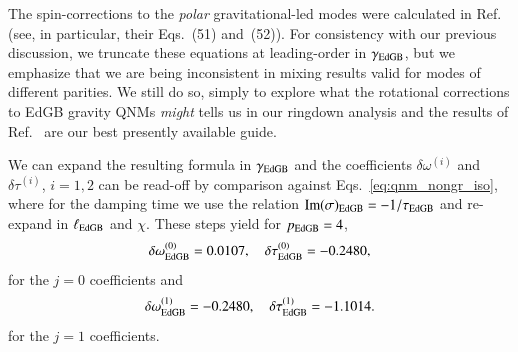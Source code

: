 \documentclass[twocolumn,
               prd,
               aps,
               superscriptaddress,
               tightenlines,
               nofootinbib,
               eqsecnum,
               amsfonts,
               amsmath,
               longbibliography]{revtex4-1}
\newcommand{\hscomm}[1]{{\textcolor{TealBlue}{{[HS: #1]}}}}
\newcommand{\abcomm}[1]{{\textcolor{red}{{[AB: #1]}}}}
\begin{document}
%
The spin-corrections to the \emph{polar} gravitational-led modes
were calculated in Ref.~\cite{Pierini:2021jxd} (see, in particular, their Eqs.~(51)
and~(52)).
%
For consistency with our previous discussion, we truncate these equations at
leading-order in $\gamma_{\rm EdGB}$, but we emphasize that we are being inconsistent in
mixing results valid for modes of different parities.
%
We still do so, simply to explore what the rotational corrections to EdGB gravity QNMs \emph{might}
tells us in our ringdown analysis and the results of Ref.~\cite{Pierini:2021jxd} are our best 
presently available guide.  

%
We can expand the resulting formula in $\gamma_{\rm EdGB}$ and the coefficients $\delta \omega^{(i)}$ and $\delta \tau^{(i)}$, $i=1,2$ can be
read-off by comparison against Eqs.~\eqref{eq:qnm_nongr_iso}, where for the damping time we use the relation ${\rm Im}(\sigma)_{\rm EdGB} = - 1 / \tau_{\rm EdGB}$
and re-expand in $\ell_{\rm EdGB}$ and $\chi$.
%
These steps yield for $p_{\rm EdGB} = 4$,
%
\begin{align}
     \delta \omega_{\rm EdGB}^{(0)} = 0.0107, \quad \delta \tau_{\rm EdGB}^{(0)} = -0.2480,
\end{align}
%
for the $j=0$ coefficients and
%
\begin{equation}
    \delta \omega_{\rm EdGB}^{(1)} = -0.2480, \quad \delta \tau_{\rm EdGB}^{(1)} = -1.1014.
\end{equation}
%
for the $j=1$ coefficients.

%
\end{document}
